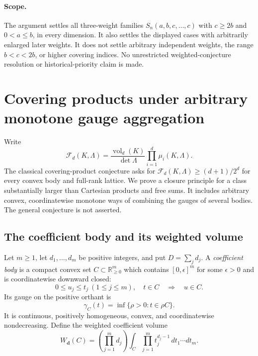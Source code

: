 \documentclass[11pt,a4paper]{article}
\theoremstyle{remark}\newtheorem{remark}[theorem]{Remark}
\begin{document}
\paragraph{Scope.}
The argument settles all three-weight families
$S_n(a,b,c,\ldots,c)$ with $c\ge2b$ and $0<a\le b$, in every
dimension.  It also settles the displayed cases with arbitrarily
enlarged later weights.  It does not settle arbitrary independent
weights, the range $b<c<2b$, or higher covering indices.  No
unrestricted weighted-conjecture resolution or historical-priority
claim is made.



\section{Covering products under arbitrary monotone gauge aggregation}
\label{c6f:sec:aggregation}

Write
\[
 \mathcal F_d(K,\Lambda)
   =\frac{\operatorname{vol}_d(K)}{\det\Lambda}
      \prod_{i=1}^d\mu_i(K,\Lambda).
\]
The classical covering-product conjecture asks for
$\mathcal F_d(K,\Lambda)\ge(d+1)/2^d$ for every convex body and
full-rank lattice.  We prove a closure principle for a class substantially
larger than Cartesian products and free sums.  It includes arbitrary
convex, coordinatewise monotone ways of combining the gauges of several
bodies.  The general conjecture is not asserted.

\subsection{The coefficient body and its weighted volume}

Let $m\ge1$, let $d_1,\ldots,d_m$ be positive integers, and put
$D=\sum_jd_j$.  A \emph{coefficient body} is a compact convex set
$C\subset\mathbb R_{\ge0}^m$ which contains $[0,\epsilon]^m$ for
some $\epsilon>0$ and is coordinatewise downward closed:
\[
 0\le u_j\le t_j\ (1\le j\le m),\quad t\in C
 \quad\Longrightarrow\quad u\in C.
\]
Its gauge on the positive orthant is
\[
 \gamma_C(t)=\inf\{\rho>0:t\in\rho C\}.
\]
It is continuous, positively homogeneous, convex, and coordinatewise
nondecreasing.  Define the weighted coefficient volume
\begin{equation}\label{c6f:eq:weighted-volume}
 W_{\boldsymbol d}(C)
   =\left(\prod_{j=1}^m d_j\right)
      \int_C\prod_{j=1}^m t_j^{d_j-1}\,dt_1\cdots dt_m.
\end{equation}
\end{document}
